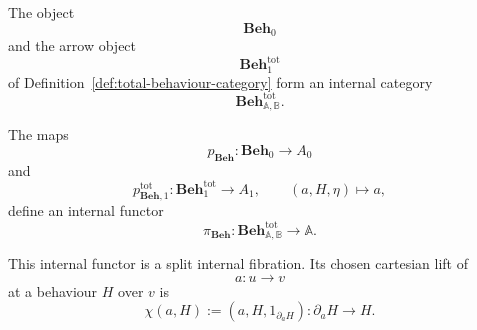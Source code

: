 \begin{theorem}
\label{thm:total-behaviour-fibration}
    The object
    \[
        \mathbf{Beh}_0
    \]
    and the arrow object
    \[
        \mathbf{Beh}^{\mathrm{tot}}_1
    \]
    of Definition~\ref{def:total-behaviour-category} form an internal
    category
    \[
        \mathbf{Beh}^{\mathrm{tot}}_{\mathbb A,\mathbb B}.
    \]

    The maps
    \[
        p_{\mathbf{Beh}}:
        \mathbf{Beh}_0\to A_0
    \]
    and
    \[
        p_{\mathbf{Beh},1}^{\mathrm{tot}}:
        \mathbf{Beh}^{\mathrm{tot}}_1\to A_1,
        \qquad
        (a,H,\eta)\longmapsto a,
    \]
    define an internal functor
    \[
        \pi_{\mathbf{Beh}}:
        \mathbf{Beh}^{\mathrm{tot}}_{\mathbb A,\mathbb B}
        \to
        \mathbb A.
    \]

    This internal functor is a split internal fibration. Its chosen
    cartesian lift of
    \[
        a:u\to v
    \]
    at a behaviour \(H\) over \(v\) is
    \[
        \chi(a,H)
        :=
        (a,H,1_{\partial_aH}):
        \partial_aH\longrightarrow H.
    \]
\end{theorem}
